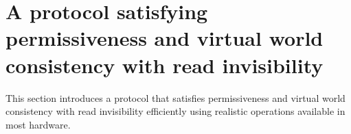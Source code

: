 % 
% 
% 
% 
% 
% 
% 
% 
% 
% 
% 











\section{A protocol satisfying permissiveness and virtual world consistency with read invisibility}

This section introduces a protocol that satisfies permissiveness and virtual world consistency with read invisibility
efficiently using realistic operations available in most hardware.


